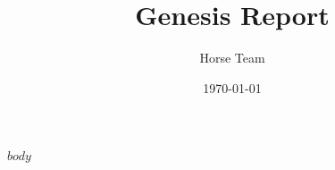 \documentclass[12pt]{article}
\title{\textcolor{primary}{Genesis Report}}
\author{\textcolor{secondary}{Horse Team}}
\date{\today}
\begin{document}
\maketitle
$body$
\end{document}
